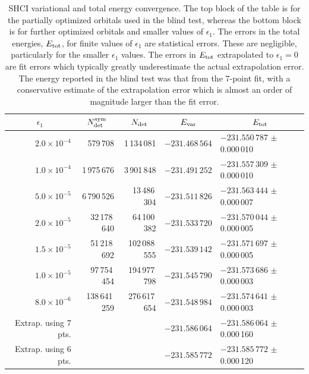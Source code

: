 \documentclass[journal=jcp,manuscript=suppinfo]{achemso}
\begin{document}
%
\begin{table}[ht!]
\begin{center}
\caption{SHCI variational and total energy convergence.  The top block of the table is for the
partially optimized orbitals used in the blind test, whereas the bottom block is for further optimized orbitals
and smaller values of $\epsilon_1$.  The errors in the total energies, $E_{\rm tot}$, for finite values of $\epsilon_1$ are
statistical errors.  These are negligible, particularly for the smaller $\epsilon_1$ values.
The errors in $E_{\rm tot}$ extrapolated to $\epsilon_1=0$ are fit errors
which typically greatly underestimate the actual extrapolation error.  The energy reported in the blind test was that from the
7-point fit, with a conservative estimate of the extrapolation error which is almost an order of magnitude larger
than the fit error.}
\label{shci_energies}
\begin{tabular}{rrrll}
\toprule
\multicolumn{1}{c}{$\epsilon_1$} & \multicolumn{1}{c}{$N^{\rm sym}_{\rm det}$} & \multicolumn{1}{c}{$N_{\rm det}$} & \multicolumn{1}{c}{$E_{\rm var}$} & \multicolumn{1}{c}{$E_{\rm tot}$} \\
\midrule
$2.0 \times 10^{-4}$ &      579\,708 &   1\,134\,081 & $-231.468\,564$   & $-231.550\,787$ $\pm$ 0.000\,010 \\
$1.0 \times 10^{-4}$ &   1\,975\,676 &   3\,901\,848 & $-231.491\,252$   & $-231.557\,309$ $\pm$ 0.000\,010 \\
$5.0 \times 10^{-5}$ &   6\,790\,526 &  13\,486\,304 & $-231.511\,826$   & $-231.563\,444$ $\pm$ 0.000\,007 \\
$2.0 \times 10^{-5}$ &  32\,178\,640 &  64\,100\,382 & $-231.533\,720$   & $-231.570\,044$ $\pm$ 0.000\,005 \\
$1.5 \times 10^{-5}$ &  51\,218\,692 & 102\,088\,555 & $-231.539\,142$   & $-231.571\,697$ $\pm$ 0.000\,005 \\
$1.0 \times 10^{-5}$ &  97\,754\,454 & 194\,977\,798 & $-231.545\,790$   & $-231.573\,686$ $\pm$ 0.000\,003 \\
$8.0 \times 10^{-6}$ & 138\,641\,259 & 276\,617\,654 & $-231.548\,984$   & $-231.574\,641$ $\pm$ 0.000\,003 \\
Extrap. using 7 pts. &&&                               $-231.586\,064$   & $-231.586\,064$ $\pm$ 0.000\,160 \\
Extrap. using 6 pts. &&&                               $-231.585\,772$   & $-231.585\,772$ $\pm$ 0.000\,120 \\

\end{tabular}
\end{center}
\end{table}
\end{document}
